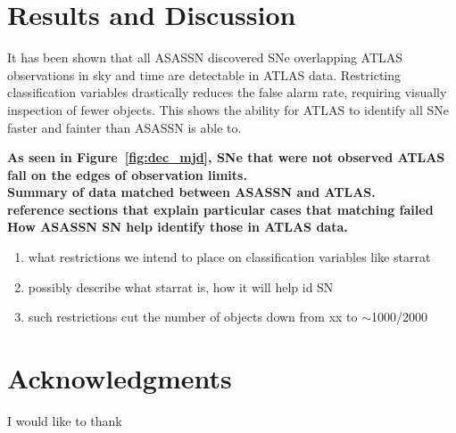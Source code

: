 \documentclass[aps,prb,twocolumn,superscriptaddress]{revtex4-1}
\begin{document}
\section{Results and Discussion}
\indent It has been shown that all ASASSN discovered SNe overlapping ATLAS 
observations in sky and time are detectable in ATLAS data. Restricting 
classification variables drastically reduces the false alarm rate, requiring 
visually inspection of fewer objects. This shows the ability for ATLAS to 
identify all SNe faster and fainter than ASASSN is able to.


{\bf As seen in Figure~\ref{fig:dec_mjd}, SNe that were not 
observed ATLAS fall on the edges of observation limits.\\}
{\bf Summary of data matched between ASASSN and ATLAS.\\
reference sections that explain particular cases that matching failed}
{\bf How ASASSN SN help identify those in ATLAS data.}
\begin{enumerate}
	\item{} what restrictions we intend to place on classification variables like starrat
	\item{} possibly describe what starrat is, how it will help id SN
	\item{} such restrictions cut the number of objects down from xx to $\sim$1000/2000
\end{enumerate}


\section*{Acknowledgments}
I would like to thank   %
\end{document}
